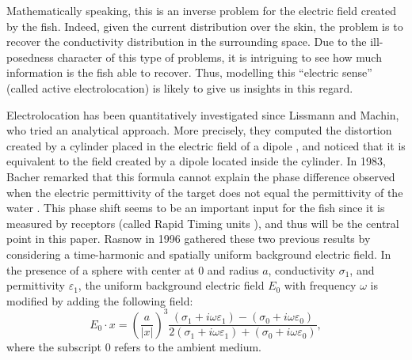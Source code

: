 \documentclass[final]{siamltex}
\numberwithin{equation}{section}
\numberwithin{figure}{section}
\numberwithin{table}{section}
\begin{document}
Mathematically speaking, this is an inverse problem for the
electric field created by the fish. Indeed, given the current
distribution over the skin,  the problem is to recover the
conductivity distribution in the surrounding space. Due to the
ill-posedness character of this type of problems, it is intriguing
to see how much information is the fish able to recover. Thus,
modelling this ``electric sense'' (called active electrolocation)
is likely to give us insights in this regard.

Electrolocation has been quantitatively investigated since
Lissmann and Machin, who tried an analytical approach. More
precisely, they computed the distortion created by a cylinder
placed in the electric field of a dipole
\cite{lissmann1958mechanism}, and noticed that it is equivalent to
the field created by a dipole located inside the cylinder. In
1983, Bacher remarked that this formula cannot explain the phase
difference observed when the electric permittivity of the target
does not equal the permittivity of the water \cite{bacher1983new}.
This phase shift seems to be an important input for the fish since
it is measured by receptors (called Rapid Timing units
\cite{moller1995}), and thus will be the central point in this
paper. Rasnow in 1996 gathered these two previous results by
considering a time-harmonic and spatially uniform background
electric field. In the presence of a sphere with center at $0$ and
radius $a$, conductivity $\sigma_{1}$, and permittivity
$\varepsilon_{1}$, the uniform background electric field ${E}_{0}$
with frequency $\omega$ is modified by adding the following field:
\begin{equation} \label{formemp}
{E}_{0}\cdot {x} = \left(\frac{a}{|{
x}|}\right)^{3}\frac{(\sigma_{1}+i\omega\varepsilon_{1})-(\sigma_{0}
+i\omega\varepsilon_{0})}{2(\sigma_{1}+i\omega\varepsilon_{1})+(\sigma_{0}+i\omega\varepsilon_{0})},
\end{equation}
 where the subscript $0$ refers to the ambient medium.
\end{document}
